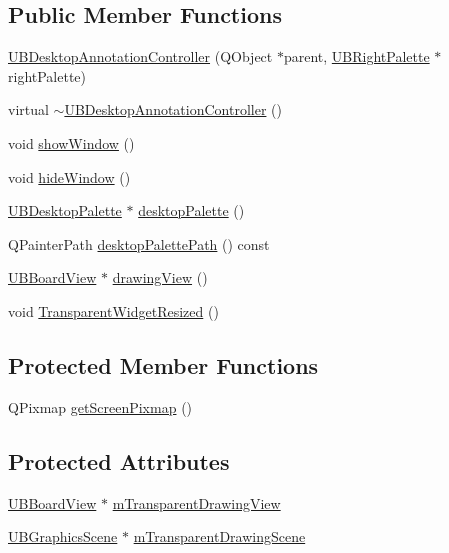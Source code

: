 \subsection*{Public Member Functions}
\begin{DoxyCompactItemize}
\item 
\hyperlink{class_u_b_desktop_annotation_controller_a1e31fa6fa39f439312757baadcaae17a}{U\-B\-Desktop\-Annotation\-Controller} (Q\-Object $\ast$parent, \hyperlink{class_u_b_right_palette}{U\-B\-Right\-Palette} $\ast$right\-Palette)
\item 
virtual \hyperlink{class_u_b_desktop_annotation_controller_a4586ab44f93560378a1cc03d23677699}{$\sim$\-U\-B\-Desktop\-Annotation\-Controller} ()
\item 
void \hyperlink{class_u_b_desktop_annotation_controller_a34cdb9c6ce21be6889dcd2e50ce8dc47}{show\-Window} ()
\item 
void \hyperlink{class_u_b_desktop_annotation_controller_a1f3515627f629611f3fbec84bf4cec15}{hide\-Window} ()
\item 
\hyperlink{class_u_b_desktop_palette}{U\-B\-Desktop\-Palette} $\ast$ \hyperlink{class_u_b_desktop_annotation_controller_a6abdbc0febbb1f2b41aadd160a11aeae}{desktop\-Palette} ()
\item 
Q\-Painter\-Path \hyperlink{class_u_b_desktop_annotation_controller_ad1e68fe7e3460252b2512e1589282aad}{desktop\-Palette\-Path} () const 
\item 
\hyperlink{class_u_b_board_view}{U\-B\-Board\-View} $\ast$ \hyperlink{class_u_b_desktop_annotation_controller_aa448093b170549b879be5a69b23b8245}{drawing\-View} ()
\item 
void \hyperlink{class_u_b_desktop_annotation_controller_a297eab60af9df9135db23e67c71f42d1}{Transparent\-Widget\-Resized} ()
\end{DoxyCompactItemize}
\subsection*{Protected Member Functions}
\begin{DoxyCompactItemize}
\item 
Q\-Pixmap \hyperlink{class_u_b_desktop_annotation_controller_a828b2f9075cb5fa0df02c7bf8d2baf54}{get\-Screen\-Pixmap} ()
\end{DoxyCompactItemize}
\subsection*{Protected Attributes}
\begin{DoxyCompactItemize}
\item 
\hyperlink{class_u_b_board_view}{U\-B\-Board\-View} $\ast$ \hyperlink{class_u_b_desktop_annotation_controller_a11d2fda8abe318d8a9e10f0fc41c4614}{m\-Transparent\-Drawing\-View}
\item 
\hyperlink{class_u_b_graphics_scene}{U\-B\-Graphics\-Scene} $\ast$ \hyperlink{class_u_b_desktop_annotation_controller_a58e3a85e54ed2c75e41eb2475300283d}{m\-Transparent\-Drawing\-Scene}
\end{DoxyCompactItemize}


